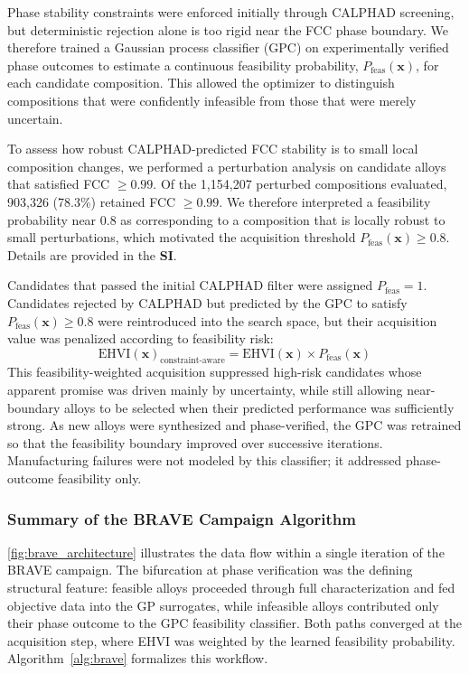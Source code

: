 Phase stability constraints were enforced initially through CALPHAD screening, but deterministic rejection alone is too rigid near the FCC phase boundary. We therefore trained a Gaussian process classifier (GPC) on experimentally verified phase outcomes to estimate a continuous feasibility probability, $P_\text{feas}(\mathbf{x})$, for each candidate composition. This allowed the optimizer to distinguish compositions that were confidently infeasible from those that were merely uncertain.

To assess how robust CALPHAD-predicted FCC stability is to small local composition changes, we performed a perturbation analysis on candidate alloys that satisfied FCC $\geq 0.99$. Of the 1,154,207 perturbed compositions evaluated, 903,326 (78.3\%) retained FCC $\geq 0.99$. We therefore interpreted a feasibility probability near 0.8 as corresponding to a composition that is locally robust to small perturbations, which motivated the acquisition threshold $P_\text{feas}(\mathbf{x}) \geq 0.8$. Details are provided in the \textbf{SI}.

Candidates that passed the initial CALPHAD filter were assigned $P_\text{feas} = 1$. Candidates rejected by CALPHAD but predicted by the GPC to satisfy $P_\text{feas}(\mathbf{x}) \geq 0.8$ were reintroduced into the search space, but their acquisition value was penalized according to feasibility risk:
\begin{equation}
    \textrm{EHVI}(\mathbf{x})_{\textrm{constraint-aware}} = \textrm{EHVI}(\mathbf{x}) \times P_{\textrm{feas}}(\mathbf{x})
\end{equation}
This feasibility-weighted acquisition suppressed high-risk candidates whose apparent promise was driven mainly by uncertainty, while still allowing near-boundary alloys to be selected when their predicted performance was sufficiently strong. As new alloys were synthesized and phase-verified, the GPC was retrained so that the feasibility boundary improved over successive iterations. Manufacturing failures were not modeled by this classifier; it addressed phase-outcome feasibility only.

\subsubsection{Summary of the BRAVE Campaign Algorithm}

\autoref{fig:brave_architecture} illustrates the data flow within a single iteration of the BRAVE campaign. The bifurcation at phase verification was the defining structural feature: feasible alloys proceeded through full characterization and fed objective data into the GP surrogates, while infeasible alloys contributed only their phase outcome to the GPC feasibility classifier. Both paths converged at the acquisition step, where EHVI was weighted by the learned feasibility probability. Algorithm~\ref{alg:brave} formalizes this workflow.

